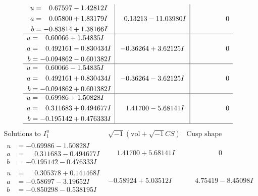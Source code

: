 \documentclass[1p]{elsarticle_modified}
\theoremstyle{definition}
\newcommand{\I}{\sqrt{-1}}
\begin{document}
$$\begin{array}{c|c|c}
\begin{aligned}
u &= \phantom{-}0.67597 - 1.42812 I \\
a &= \phantom{-}0.05800 + 1.83179 I \\
b &= -0.83814 + 1.38166 I\end{aligned}
 & \phantom{-}0.13213 - 11.03980 I & \phantom{-0.000000 } 0 \\ \hline\begin{aligned}
u &= \phantom{-}0.60066 + 1.54835 I \\
a &= \phantom{-}0.492161 - 0.830434 I \\
b &= -0.094862 - 0.601382 I\end{aligned}
 & -0.36264 + 3.62125 I & \phantom{-0.000000 } 0 \\ \hline\begin{aligned}
u &= \phantom{-}0.60066 - 1.54835 I \\
a &= \phantom{-}0.492161 + 0.830434 I \\
b &= -0.094862 + 0.601382 I\end{aligned}
 & -0.36264 - 3.62125 I & \phantom{-0.000000 } 0 \\ \hline\begin{aligned}
u &= -0.69986 + 1.50828 I \\
a &= \phantom{-}0.311683 + 0.494677 I \\
b &= -0.195142 + 0.476333 I\end{aligned}
 & \phantom{-}1.41700 - 5.68141 I & \phantom{-0.000000 } 0\\
 \hline 
 \end{array}$$\newpage$$\begin{array}{c|c|c}  
\text{Solutions to }I^u_{1}& \I (\text{vol} + \sqrt{-1}CS) & \text{Cusp shape}\\
 \hline 
\begin{aligned}
u &= -0.69986 - 1.50828 I \\
a &= \phantom{-}0.311683 - 0.494677 I \\
b &= -0.195142 - 0.476333 I\end{aligned}
 & \phantom{-}1.41700 + 5.68141 I & \phantom{-0.000000 } 0 \\ \hline\begin{aligned}
u &= \phantom{-}0.305378 + 0.141468 I \\
a &= -0.58697 - 3.19652 I \\
b &= -0.850298 - 0.538195 I\end{aligned}
 & -0.58924 + 5.03512 I & \phantom{-}4.75419 - 8.45098 I \\ \hline\begin{aligned}

\end{aligned}
\end{array}$$
\end{document}
